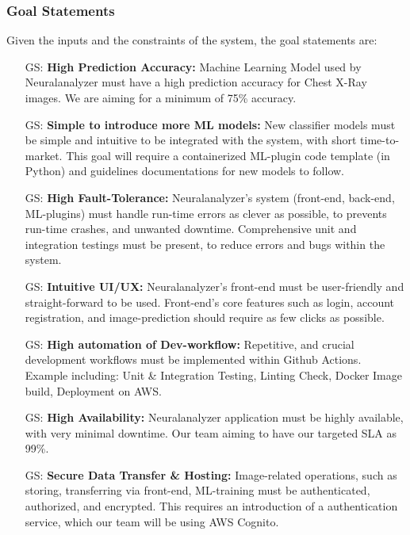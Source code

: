 \documentclass[12pt]{article}
\newcounter{goalnum} %
\begin{document}
\subsubsection{Goal Statements}
\noindent Given the inputs and the constraints of the system, the goal statements are:

\begin{itemize}

\item[GS\refstepcounter{goalnum}\thegoalnum \label{G_prediction_accuracy}:] \textbf{High Prediction Accuracy: }Machine Learning Model used by Neuralanalyzer must have a high prediction accuracy for Chest X-Ray images. We are aiming for a minimum of 75\% accuracy.
\item[GS\refstepcounter{goalnum}\thegoalnum \label{G_ease_of_ML_intro}:] \textbf{Simple to introduce more ML models: }New classifier models must be simple and intuitive to be integrated with the system, with short time-to-market. This goal will require a containerized ML-plugin code template (in Python) and guidelines documentations for new models to follow.
\item[GS\refstepcounter{goalnum}\thegoalnum \label{G_fault-tolerance}:] \textbf{High Fault-Tolerance: }Neuralanalyzer's system (front-end, back-end, ML-plugins) must handle run-time errors as clever as possible, to prevents run-time crashes, and unwanted downtime. Comprehensive unit and integration testings must be present, to reduce errors and bugs within the system.
\item[GS\refstepcounter{goalnum}\thegoalnum \label{G_good_UI}:] \textbf{Intuitive UI/UX: }Neuralanalyzer's front-end must be user-friendly and straight-forward to be used. Front-end's core features such as login, account registration, and image-prediction should require as few clicks as possible.
\item[GS\refstepcounter{goalnum}\thegoalnum \label{G_dev_work_automation}:] \textbf{High automation of Dev-workflow: }Repetitive, and crucial development workflows must be implemented within Github Actions. Example including: Unit \& Integration Testing, Linting Check, Docker Image build, Deployment on AWS.
\item[GS\refstepcounter{goalnum}\thegoalnum \label{G_avaialblity}:] \textbf{High Availability: }Neuralanalyzer application must be highly available, with very minimal downtime. Our team aiming to have our targeted SLA as 99\%.
\item[GS\refstepcounter{goalnum}\thegoalnum \label{G_data_security}:] \textbf{Secure Data Transfer \& Hosting: }Image-related operations, such as storing, transferring via front-end, ML-training must be authenticated, authorized, and encrypted. This requires an introduction of a authentication service, which our team will be using AWS Cognito.

\end{itemize}
\end{document}
